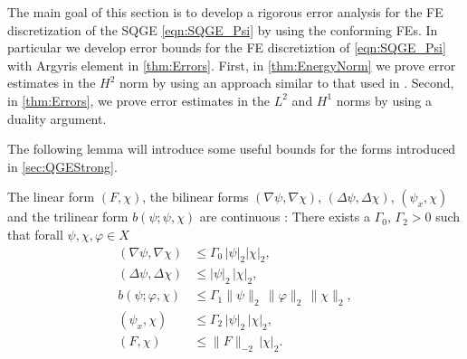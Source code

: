 The main goal of this section is to develop a rigorous error analysis for the FE
discretization of the SQGE \eqref{eqn:SQGE_Psi} by using the conforming FEs. In
particular we develop error bounds for the FE discretiztion of
\eqref{eqn:SQGE_Psi} with Argyris element in \autoref{thm:Errors}. First, in
\autoref{thm:EnergyNorm} we prove error estimates in the $H^2$ norm by using an
approach similar to that used in \cite{Cayco86}.  Second, in
\autoref{thm:Errors}, we prove error estimates in the $L^2$ and $H^1$ norms by
using a duality argument.

The following lemma will introduce some useful bounds for the forms introduced
in \autoref{sec:QGEStrong}.
\begin{lemma} \label{lma:ContinuousForms}
  The linear form $(F,\chi)$, the bilinear forms $(\nabla \psi, \nabla \chi)$,
  $(\Delta \psi, \Delta \chi)$, $(\psi_x, \chi)$ and the trilinear form $b(\psi;
  \psi, \chi)$ are continuous \cite{Cayco86}: There exists a $\Gamma_0,\,
   \Gamma_2 > 0$ such that forall $\psi, \chi, \varphi\in X$
  \begin{align}
    (\nabla \psi, \nabla \chi) &\le \Gamma_0\, |\psi|_2 |\chi|_2,
      \label{eqn:a0cont} \\
    (\Delta \psi, \Delta \chi) &\le |\psi|_2\, |\chi|_2, \label{eqn:a1Cont} \\
    b(\psi;\varphi,\chi) &\le \Gamma_1 \|\psi\|_2\, \|\varphi\|_2\, \|\chi\|_2,
      \label{eqn:BH2Bounds} \\
    (\psi_x,\chi) &\le \Gamma_2 \, |\psi|_2 \, |\chi|_2, \label{eqn:a3Cont} \\
    (F,\chi) &\le \|F\|_{-2} \, |\chi|_2.
      \label{eqn:lCont}
  \end{align}
\end{lemma}
